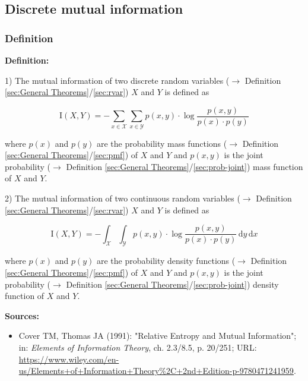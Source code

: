 \documentclass[a4paper,12pt,twoside]{book}
\begin{document}
\subsection{Discrete mutual information}

\subsubsection[\textit{Definition}]{Definition} \label{sec:mi}
\setcounter{equation}{0}

\textbf{Definition:}

1) The mutual information of two discrete random variables ($\rightarrow$ Definition \ref{sec:General Theorems}/\ref{sec:rvar}) $X$ and $Y$ is defined as

\begin{equation} \label{eq:mi-mi-disc}
\mathrm{I}(X,Y) = - \sum_{x \in \mathcal{X}} \sum_{x \in \mathcal{Y}} p(x,y) \cdot \log \frac{p(x,y)}{p(x) \cdot p(y)}
\end{equation}

where $p(x)$ and $p(y)$ are the probability mass functions ($\rightarrow$ Definition \ref{sec:General Theorems}/\ref{sec:pmf}) of $X$ and $Y$ and $p(x,y)$ is the joint probability ($\rightarrow$ Definition \ref{sec:General Theorems}/\ref{sec:prob-joint}) mass function of $X$ and $Y$.

2) The mutual information of two continuous random variables ($\rightarrow$ Definition \ref{sec:General Theorems}/\ref{sec:rvar}) $X$ and $Y$ is defined as

\begin{equation} \label{eq:mi-mi-cont}
\mathrm{I}(X,Y) = - \int_{\mathcal{X}} \int_{\mathcal{Y}} p(x,y) \cdot \log \frac{p(x,y)}{p(x) \cdot p(y)} \, \mathrm{d}y \, \mathrm{d}x
\end{equation}

where $p(x)$ and $p(y)$ are the probability density functions ($\rightarrow$ Definition \ref{sec:General Theorems}/\ref{sec:pmf}) of $X$ and $Y$ and $p(x,y)$ is the joint probability ($\rightarrow$ Definition \ref{sec:General Theorems}/\ref{sec:prob-joint}) density function of $X$ and $Y$.


\vspace{1em}
\textbf{Sources:}
\begin{itemize}
\item Cover TM, Thomas JA (1991): "Relative Entropy and Mutual Information"; in: \textit{Elements of Information Theory}, ch. 2.3/8.5, p. 20/251; URL: \url{https://www.wiley.com/en-us/Elements+of+Information+Theory%2C+2nd+Edition-p-9780471241959}.
\end{itemize}
\end{document}
